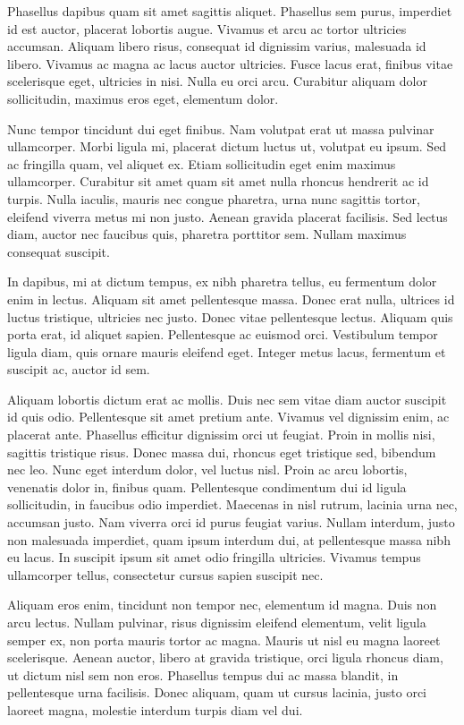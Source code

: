 Phasellus dapibus quam sit amet sagittis aliquet. Phasellus sem purus, imperdiet id est auctor, placerat lobortis augue. Vivamus et arcu ac tortor ultricies accumsan. Aliquam libero risus, consequat id dignissim varius, malesuada id libero. Vivamus ac magna ac lacus auctor ultricies. Fusce lacus erat, finibus vitae scelerisque eget, ultricies in nisi. Nulla eu orci arcu. Curabitur aliquam dolor sollicitudin, maximus eros eget, elementum dolor.

Nunc tempor tincidunt dui eget finibus. Nam volutpat erat ut massa pulvinar ullamcorper. Morbi ligula mi, placerat dictum luctus ut, volutpat eu ipsum. Sed ac fringilla quam, vel aliquet ex. Etiam sollicitudin eget enim maximus ullamcorper. Curabitur sit amet quam sit amet nulla rhoncus hendrerit ac id turpis. Nulla iaculis, mauris nec congue pharetra, urna nunc sagittis tortor, eleifend viverra metus mi non justo. Aenean gravida placerat facilisis. Sed lectus diam, auctor nec faucibus quis, pharetra porttitor sem. Nullam maximus consequat suscipit.

In dapibus, mi at dictum tempus, ex nibh pharetra tellus, eu fermentum dolor enim in lectus. Aliquam sit amet pellentesque massa. Donec erat nulla, ultrices id luctus tristique, ultricies nec justo. Donec vitae pellentesque lectus. Aliquam quis porta erat, id aliquet sapien. Pellentesque ac euismod orci. Vestibulum tempor ligula diam, quis ornare mauris eleifend eget. Integer metus lacus, fermentum et suscipit ac, auctor id sem.

Aliquam lobortis dictum erat ac mollis. Duis nec sem vitae diam auctor suscipit id quis odio. Pellentesque sit amet pretium ante. Vivamus vel dignissim enim, ac placerat ante. Phasellus efficitur dignissim orci ut feugiat. Proin in mollis nisi, sagittis tristique risus. Donec massa dui, rhoncus eget tristique sed, bibendum nec leo. Nunc eget interdum dolor, vel luctus nisl. Proin ac arcu lobortis, venenatis dolor in, finibus quam. Pellentesque condimentum dui id ligula sollicitudin, in faucibus odio imperdiet. Maecenas in nisl rutrum, lacinia urna nec, accumsan justo. Nam viverra orci id purus feugiat varius. Nullam interdum, justo non malesuada imperdiet, quam ipsum interdum dui, at pellentesque massa nibh eu lacus. In suscipit ipsum sit amet odio fringilla ultricies. Vivamus tempus ullamcorper tellus, consectetur cursus sapien suscipit nec.

Aliquam eros enim, tincidunt non tempor nec, elementum id magna. Duis non arcu lectus. Nullam pulvinar, risus dignissim eleifend elementum, velit ligula semper ex, non porta mauris tortor ac magna. Mauris ut nisl eu magna laoreet scelerisque. Aenean auctor, libero at gravida tristique, orci ligula rhoncus diam, ut dictum nisl sem non eros. Phasellus tempus dui ac massa blandit, in pellentesque urna facilisis. Donec aliquam, quam ut cursus lacinia, justo orci laoreet magna, molestie interdum turpis diam vel dui.

